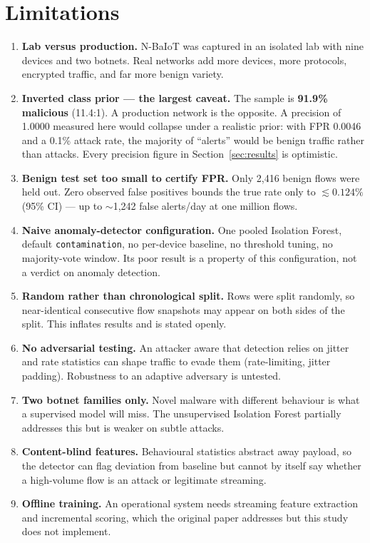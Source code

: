 \documentclass[11pt]{article}
\begin{document}
\section{Limitations}\label{sec:limitations}
\begin{enumerate}[itemsep=3pt]
  \item \textbf{Lab versus production.} N-BaIoT was captured in an isolated
        lab with nine devices and two botnets. Real networks add more devices,
        more protocols, encrypted traffic, and far more benign variety.
  \item \textbf{Inverted class prior --- the largest caveat.} The sample is
        \textbf{91.9\% malicious} (11.4:1). A production network is the
        opposite. A precision of 1.0000 measured here would collapse under a
        realistic prior: with FPR 0.0046 and a 0.1\% attack rate, the majority
        of ``alerts'' would be benign traffic rather than attacks. Every
        precision figure in Section~\ref{sec:results} is optimistic.
  \item \textbf{Benign test set too small to certify FPR.} Only 2,416 benign
        flows were held out. Zero observed false positives bounds the true rate
        only to $\lesssim 0.124\%$ (95\% CI) --- up to $\sim$1,242 false
        alerts/day at one million flows.
  \item \textbf{Naive anomaly-detector configuration.} One pooled Isolation
        Forest, default \texttt{contamination}, no per-device baseline, no
        threshold tuning, no majority-vote window. Its poor result is a property
        of this configuration, not a verdict on anomaly detection.
  \item \textbf{Random rather than chronological split.} Rows were split
        randomly, so near-identical consecutive flow snapshots may appear on
        both sides of the split. This inflates results and is stated openly.
  \item \textbf{No adversarial testing.} An attacker aware that detection
        relies on jitter and rate statistics can shape traffic to evade them
        (rate-limiting, jitter padding). Robustness to an adaptive adversary is
        untested.
  \item \textbf{Two botnet families only.} Novel malware with different
        behaviour is what a supervised model will miss. The unsupervised
        Isolation Forest partially addresses this but is weaker on subtle
        attacks.
  \item \textbf{Content-blind features.} Behavioural statistics abstract away
        payload, so the detector can flag deviation from baseline but cannot by
        itself say whether a high-volume flow is an attack or legitimate
        streaming.
  \item \textbf{Offline training.} An operational system needs streaming
        feature extraction and incremental scoring, which the original paper
        addresses but this study does not implement.
\end{enumerate}
\end{document}
